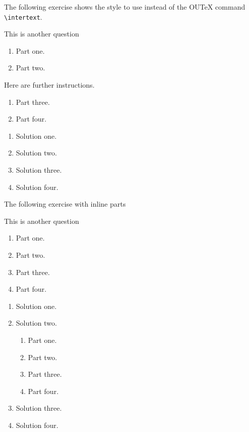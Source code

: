 \documentclass[solutionsatend,twocolumnsolutions]{ouunit}
\begin{document}
The following exercise shows the style to use instead of the OUTeX command \verb”\intertext”.
\begin{exercise}\label{exe-intertext}
This is another question
\begin{enumerate}
\item Part one.
\item Part two.
\end{enumerate}
Here are further instructions.
\begin{enumerate}[resume]
\item Part three.
\item Part four.
\end{enumerate}
\begin{solution}
\begin{enumerate}
\item Solution one.
\item Solution two.
\item Solution three.
\item Solution four.
\end{enumerate}
\end{solution}
\end{exercise}
The following exercise with inline parts
\begin{exercise}\label{exe-intertext2}
This is another question
\begin{enumerate}
\item Part one.
\item Part two.
\item Part three.
\item Part four.
\end{enumerate}
\begin{solution}
\begin{enumerate}
\item Solution one.
\item Solution two.
\begin{enumerate}
\item Part one.
\item Part two.
\item Part three.
\item Part four.
\end{enumerate}
\item Solution three.
\item Solution four.
\end{enumerate}
\end{solution}
\end{exercise}
\end{document}
